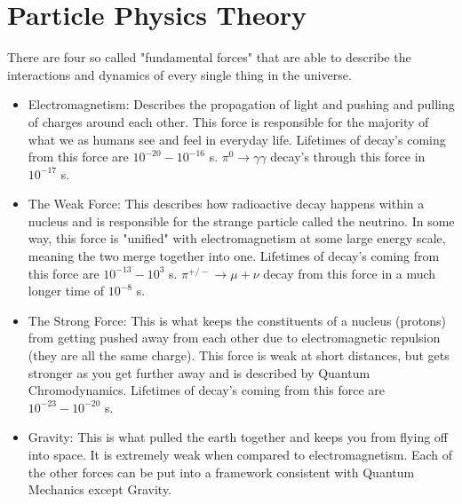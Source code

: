 
\chapter{Particle Physics Theory}
There are four so called "fundamental forces" that are able to describe the interactions and dynamics of every single thing in the universe. 

\begin{itemize}
    \item Electromagnetism: Describes the propagation of light and pushing and pulling of charges around each other. This force is responsible for the majority of what we as humans see and feel in everyday life. Lifetimes of decay's coming from this force are $10^{-20} - 10^{-16}$ s. $\pi^0\rightarrow \gamma\gamma$ decay's through this force in $10^{-17}$ s.
    \item The Weak Force: This describes how radioactive decay happens within a nucleus and is responsible for the strange particle called the neutrino. In some way, this force is "unified" with electromagnetism at some large energy scale, meaning the two merge together into one. Lifetimes of decay's coming from this force are $10^{-13} - 10^{3}$ s. $\pi^{+/-} \rightarrow \mu+\nu$ decay from this force in a much longer time of $10^{-8}$ s.
    \item The Strong Force: This is what keeps the constituents of a nucleus (protons) from getting pushed away from each other due to electromagnetic repulsion (they are all the same charge). This force is weak at short distances, but gets stronger as you get further away and is described by Quantum Chromodynamics. Lifetimes of decay's coming from this force are $10^{-23} - 10^{-20}$ s. 
    \item Gravity: This is what pulled the earth together and keeps you from flying off into space. It is extremely weak when compared to electromagnetism. Each of the other forces can be put into a framework consistent with Quantum Mechanics except Gravity.
\end{itemize}



